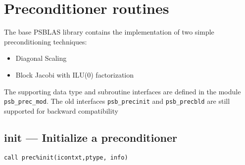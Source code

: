 \section{Preconditioner routines}
\label{sec:precs}

\label{sec:psprecs}
The base PSBLAS library  contains the implementation of two simple
preconditioning techniques:
\begin{itemize}
\item Diagonal Scaling
\item Block Jacobi with ILU(0) factorization
\end{itemize}
The supporting data type and subroutine interfaces are defined in the
module  \verb|psb_prec_mod|.
The old interfaces \verb|psb_precinit| and  \verb|psb_precbld| are still supported for
backward compatibility


\clearpage\subsection{init --- Initialize a  preconditioner}

\begin{verbatim}
call prec%init(icontxt,ptype, info)
\end{verbatim}

